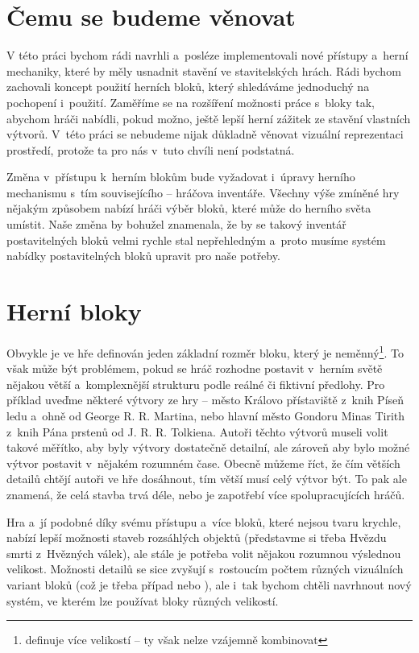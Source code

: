 \section{Čemu se budeme věnovat}
V této práci bychom rádi navrhli a~posléze implementovali nové přístupy a~herní mechaniky, které by měly usnadnit stavění ve stavitelských hrách. Rádi bychom zachovali koncept použití herních bloků, který shledáváme jednoduchý na pochopení i~použití. Zaměříme se na rozšíření možnosti práce s~bloky tak, abychom hráči nabídli, pokud možno, ještě lepší herní zážitek ze stavění vlastních výtvorů. V~této práci se nebudeme nijak důkladně věnovat vizuální reprezentaci prostředí, protože ta pro nás v~tuto chvíli není podstatná.

Změna v~přístupu k~herním blokům bude vyžadovat i~úpravy herního mechanismu s~tím souvisejícího -- hráčova inventáře. Všechny výše zmíněné hry nějakým způsobem nabízí hráči výběr bloků, které může do herního světa umístit. Naše změna by bohužel znamenala, že by se takový inventář postavitelných bloků velmi rychle stal nepřehledným a~proto musíme systém nabídky postavitelných bloků upravit pro naše potřeby.


\section{Herní bloky}
Obvykle je ve hře definován jeden základní rozměr bloku, který je neměnný\footnote{\SE{} definuje více velikostí -- ty však nelze vzájemně kombinovat}. To však může být problémem, pokud se hráč rozhodne postavit v~herním světě nějakou větší a~komplexnější strukturu podle reálné či fiktivní předlohy. Pro příklad uveďme některé výtvory ze hry \MC{} -- město Královo přístaviště z~knih Píseň ledu a~ohně od George R. R. Martina, nebo hlavní město Gondoru Minas Tirith z~knih Pána prstenů od J. R. R. Tolkiena. Autoři těchto výtvorů museli volit takové měřítko, aby byly výtvory dostatečně detailní, ale zároveň aby bylo možné výtvor postavit v~nějakém rozumném čase. Obecně můžeme říct, že čím větších detailů chtějí autoři ve hře \MC{} dosáhnout, tím větší musí celý výtvor být. To pak ale znamená, že celá stavba trvá déle, nebo je zapotřebí více spolupracujících hráčů. 

Hra \SE{} a~jí podobné díky svému přístupu a~více bloků, které nejsou tvaru krychle, nabízí lepší možnosti staveb rozsáhlých objektů (představme si třeba Hvězdu smrti z~Hvězných válek), ale stále je potřeba volit nějakou rozumnou výslednou velikost. Možnosti detailů se sice zvyšují s~rostoucím počtem různých vizuálních variant bloků (což je třeba případ \SE{} nebo \NI{}), ale i~tak bychom chtěli navrhnout nový systém, ve kterém lze používat bloky různých velikostí.




